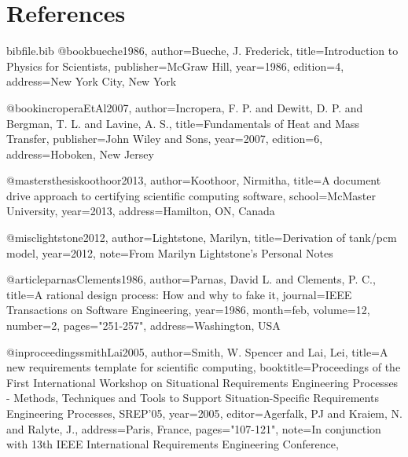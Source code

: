 \documentclass[12pt]{article}
\begin{document}
\section{References}
\label{Sec:References}
\begin{filecontents*}{bibfile.bib}
@book{bueche1986,
author={Bueche, J. Frederick},
title={Introduction to Physics for Scientists},
publisher={McGraw Hill},
year={1986},
edition={4},
address={New York City, New York}}

@book{incroperaEtAl2007,
author={Incropera, F. P. and Dewitt, D. P. and Bergman, T. L. and Lavine, A. S.},
title={Fundamentals of Heat and Mass Transfer},
publisher={John Wiley and Sons},
year={2007},
edition={6},
address={Hoboken, New Jersey}}

@mastersthesis{koothoor2013,
author={Koothoor, Nirmitha},
title={A document drive approach to certifying scientific computing software},
school={McMaster University},
year={2013},
address={Hamilton, ON, Canada}}

@misc{lightstone2012,
author={Lightstone, Marilyn},
title={Derivation of tank/pcm model},
year={2012},
note={From Marilyn Lightstone's Personal Notes}}

@article{parnasClements1986,
author={Parnas, David L. and Clements, P. C.},
title={A rational design process: How and why to fake it},
journal={IEEE Transactions on Software Engineering},
year={1986},
month={feb},
volume={12},
number={2},
pages={"251-257"},
address={Washington, USA}}

@inproceedings{smithLai2005,
author={Smith, W. Spencer and Lai, Lei},
title={A new requirements template for scientific computing},
booktitle={Proceedings of the First International Workshop on Situational Requirements Engineering Processes - Methods, Techniques and Tools to Support Situation-Specific Requirements Engineering Processes, SREP'05},
year={2005},
editor={Agerfalk, PJ and Kraiem, N. and Ralyte, J.},
address={Paris, France},
pages={"107-121"},
note={In conjunction with 13th IEEE International Requirements Engineering Conference,}}
\end{filecontents*}
\nocite{*}
\printbibliography[heading=none]
\end{document}

